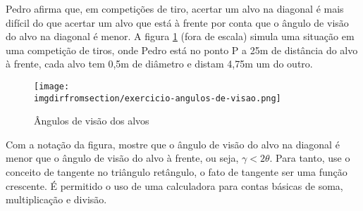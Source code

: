 \begin{exercise}
  Pedro afirma que, em competições de tiro, acertar um alvo na diagonal é mais difícil do que acertar um alvo que está à frente por conta que o ângulo de visão do alvo na diagonal é menor. A figura \ref{fig:angulos-de-visao} (fora de escala) simula uma situação em uma competição de tiros, onde Pedro está no ponto P a 25m de distância do alvo à frente, cada alvo tem 0,5m de diâmetro e distam 4,75m um do outro.
        \begin{figure}[H]
          \centering 
          \texttt{[image: \\imgdirfromsection/exercicio-angulos-de-visao.png]} 
          \caption{Ângulos de visão dos alvos}
          \label{fig:angulos-de-visao}
        \end{figure}
        Com a notação da figura, mostre que o ângulo de visão do alvo na diagonal é menor que o ângulo de visão do alvo à frente, ou seja, $\gamma < 2\theta$. Para tanto, use o conceito de tangente no triângulo retângulo, o fato de tangente ser uma função crescente. É permitido o uso de uma calculadora para contas básicas de soma, multiplicação e divisão.
\end{exercise}

